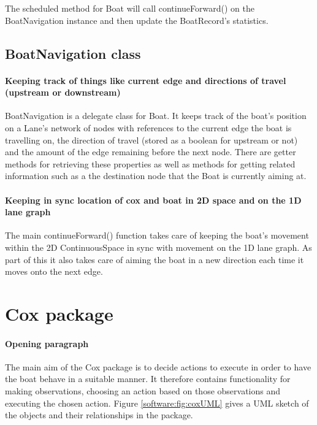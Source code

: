 The scheduled method for Boat will call continueForward() on the
BoatNavigation instance and then update the BoatRecord's statistics.
\subsection{BoatNavigation class}
\paragraph{Keeping track of things like current edge and
directions of travel (upstream or downstream)}
BoatNavigation is a delegate class for Boat. It keeps track of the
boat's position on a Lane's network of nodes with references to the
current edge the boat is travelling on, the direction of travel
(stored as a boolean for upstream or not) and the amount of the edge
remaining before the next node. There are getter methods for
retrieving these properties as well as methods for getting related
information such as a the destination node that the Boat is currently
aiming at.

\paragraph{Keeping in sync location of cox and boat in 2D space and on the 1D lane graph}
The main continueForward() function takes care of keeping the
boat's movement within the 2D ContinuousSpace in sync with
movement on the 1D lane graph. As part of this it also takes care of
aiming the boat in a new direction each time it moves onto the next
edge.



\section{Cox package}
\paragraph{Opening paragraph}
The main aim of the Cox package is to decide actions to execute in order to have the boat behave in a suitable manner. It therefore contains functionality for making observations, choosing an action based on those observations and executing the chosen action. Figure \ref{software:fig:coxUML} gives a UML sketch of the objects and their relationships in the package.

